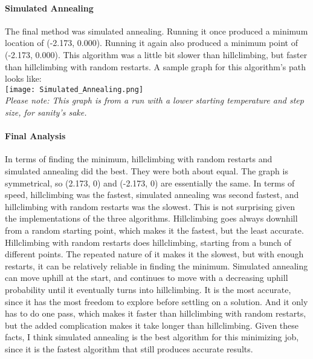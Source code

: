\documentclass[12pt,letterpaper]{report}
\begin{document}
\paragraph*{Simulated Annealing}
The final method was simulated annealing. Running it once produced a minimum location of (-2.173, 0.000). Running it again also produced a minimum point of (-2.173, 0.000). This algorithm was a little bit slower than hillclimbing, but faster than hillclimbing with random restarts. A sample graph for this algorithm's path looks like:\\
\texttt{[image: Simulated\_Annealing.png]}\\
\textit{Please note: This graph is from a run with a lower starting temperature and step size, for sanity's sake.}
\paragraph*{Final Analysis}
In terms of finding the minimum, hillclimbing with random restarts and simulated annealing did the best. They were both about equal. The graph is symmetrical, so (2.173, 0) and (-2.173, 0) are essentially the same. In terms of speed, hillclimbing was the fastest, simulated annealing was second fastest, and hillclimbing with random restarts was the slowest. This is not surprising given the implementations of the three algorithms. Hillclimbing goes always downhill from a random starting point, which makes it the fastest, but the least accurate. Hillclimbing with random restarts does hillclimbing, starting from a bunch of different points. The repeated nature of it makes it the slowest, but with enough restarts, it can be relatively reliable in finding the minimum. Simulated annealing can move uphill at the start, and continues to move with a decreasing uphill probability until it eventually turns into hillclimbing. It is the most accurate, since it has the most freedom to explore before settling on a solution. And it only has to do one pass, which makes it faster than hillclimbing with random restarts, but the added complication makes it take longer than hillclimbing. Given these facts, I think simulated annealing is the best algorithm for this minimizing job, since it is the fastest algorithm that still produces accurate results.
\end{document}

